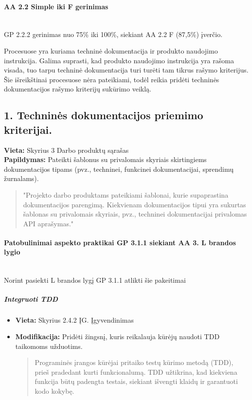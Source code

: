 \documentclass{article}
\newcommand{\subsubsubsection}[1]{\paragraph{#1}\mbox{}\\}
\begin{document}
\subsubsubsection{AA 2.2 Simple iki F gerinimas}

GP 2.2.2 gerinimas nuo 75\% iki 100\%, siekiant AA 2.2 F (87,5\%) įverčio.

\color{red}Procesuose yra kuriama techninė dokumentacija ir produkto naudojimo instrukcija. Galima suprasti, kad produkto naudojimo instrukcija yra rašoma visada, tuo tarpu techninė dokumentacija turi turėti tam tikrus rašymo kriterijus. Šie išreikštinai procesuose nėra pateikiami, todėl reikia pridėti techninės dokumentacijos rašymo kriterijų sukūrimo veiklą. 

\subsection*{1. Techninės dokumentacijos priemimo kriterijai.}
\textbf{Vieta:} Skyrius 3 Darbo produktų sąrašas \\
\textbf{Papildymas:} Pateikti šablonus su privalomais skyriais skirtingiems dokumentacijos tipams (pvz., techninei, funkcinei dokumentacijai, sprendimų žurnalams).
\begin{quote}
"Projekto darbo produktams pateikiami šablonai, kurie supaprastina dokumentacijos parengimą. Kiekvienam dokumentacijos tipui yra sukurtas šablonas su privalomais skyriais, pvz., techninei dokumentacijai privalomas API aprašymas."
\end{quote}
\color{black}

\subsubsubsection{Patobulinimai aspekto praktikai GP 3.1.1 siekiant AA 3. L brandos lygio}

Norint pasiekti L brandos lygį GP 3.1.1 atlikti šie pakeitimai

\subparagraph{Integruoti TDD}
\begin{itemize}
    \item \textbf{Vieta:} Skyrius 2.4.2 ĮG. Įgyvendinimas 
    \item \textbf{Modifikacija:} Pridėti žingsnį, kuris reikalauja kūrėjų naudoti TDD taikomoms užduotims.
    \begin{quote} Programinės įrangos kūrėjai pritaiko testų kūrimo metodą (TDD), prieš pradedant kurti funkcionalumą. TDD užtikrina, kad kiekviena funkcija būtų padengta testais, siekiant išvengti klaidų ir garantuoti kodo kokybę.
    \end{quote}
\end{itemize}
\end{document}
